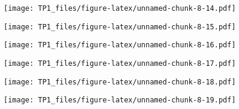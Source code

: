 \documentclass[
]{article}
\newenvironment{Shaded}{\begin{snugshade}}{\end{snugshade}}
\newcommand{\DataTypeTok}[1]{\textcolor[rgb]{0.13,0.29,0.53}{#1}}
\newcommand{\DecValTok}[1]{\textcolor[rgb]{0.00,0.00,0.81}{#1}}
\newcommand{\KeywordTok}[1]{\textcolor[rgb]{0.13,0.29,0.53}{\textbf{#1}}}
\newcommand{\NormalTok}[1]{#1}
\newcommand{\OperatorTok}[1]{\textcolor[rgb]{0.81,0.36,0.00}{\textbf{#1}}}
\newcommand{\StringTok}[1]{\textcolor[rgb]{0.31,0.60,0.02}{#1}}
\begin{document}
\texttt{[image: TP1\_files/figure-latex/unnamed-chunk-8-14.pdf]}

\begin{Shaded}
\end{Shaded}

\texttt{[image: TP1\_files/figure-latex/unnamed-chunk-8-15.pdf]}

\begin{Shaded}
\end{Shaded}

\texttt{[image: TP1\_files/figure-latex/unnamed-chunk-8-16.pdf]}

\begin{Shaded}
\end{Shaded}

\texttt{[image: TP1\_files/figure-latex/unnamed-chunk-8-17.pdf]}

\begin{Shaded}
\end{Shaded}

\texttt{[image: TP1\_files/figure-latex/unnamed-chunk-8-18.pdf]}

\begin{Shaded}
\end{Shaded}

\texttt{[image: TP1\_files/figure-latex/unnamed-chunk-8-19.pdf]}
\end{document}
